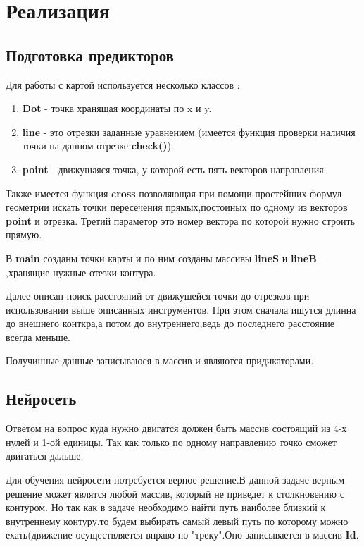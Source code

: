 \section{Реализация}
\subsection{Подготовка предикторов}
    Для работы с картой используется несколько классов :
    \begin{enumerate}
        \item \textbf{Dot} - точка хранящая координаты по x и y.
        \item \textbf{line} - это отрезки заданные уравнением (имеется функция проверки наличия точки на данном отрезке-\textbf{check()}).
        \item \textbf{point} - движушаяся точка, у которой есть пять векторов направления.
	\end{enumerate}
	
	Также имеется функция  \textbf{cross} позволяющая при помощи простейших формул геометрии искать точки пересечения прямых,постоиных по одному из векторов \textbf{point} и отрезка. Третий параметор это номер вектора по которой нужно строить прямую.
	
	В \textbf{main} созданы точки карты и по ним созданы массивы \textbf{lineS} и \textbf{lineB} ,хранящие нужные отезки контура.
	
	Далее описан поиск расстояний от движушейся точки до отрезков при использовании выше описанных инструментов. При этом сначала ишутся длинна до внешнего конткра,а потом до внутреннего,ведь до последнего расстояние всегда меньше.
	
	Получинные данные записываюся в массив и являются придикаторами.

\subsection{Нейросеть}
    Ответом на вопрос куда нужно двигатся должен быть массив состоящий из 4-х нулей и 1-ой единицы. Так как только по одному направлению точко сможет двигаться дальше.
    
	Для обучения нейросети потребуется верное решение.В данной задаче верным решение может являтся любой массив, который не приведет к столкновению с контуром. Но так как в задаче необходимо найти путь наиболее близкий к внутреннему контуру,то будем выбирать самый левый путь по которому можно ехать(движение осуществляется вправо по "треку".Оно записывается в массив \textbf{Id}.
	
